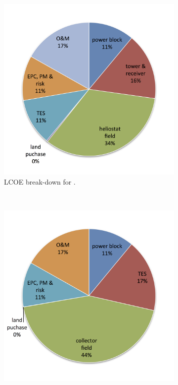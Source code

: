 \begin{figure}[!htbp]
        \centering                
        \begin{subfigure}[b]{0.5\textwidth}
                \centering
                \includegraphics[width=1\textwidth]{FIG/CR_LCOE_90_BreakDown}
                \caption{LCOE break-down for .}\label{CR_LCOE_90_BreakDown}
        \end{subfigure}%
        ~
        \begin{subfigure}[b]{0.5\textwidth}
                \centering
                \includegraphics[width=1\textwidth]{FIG/PTC_LCOE_90_BreakDown}

\end{subfigure}
\end{figure}
